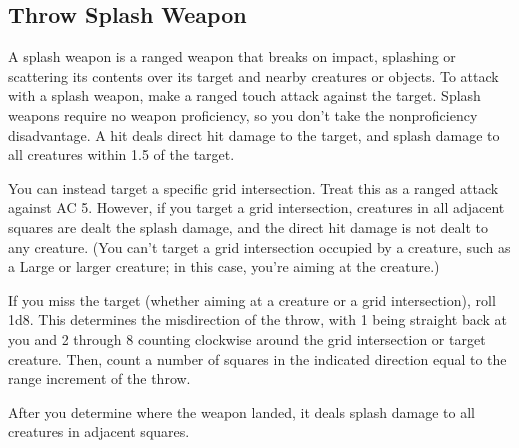 \subsection{Throw Splash Weapon}
A splash weapon is a ranged weapon that breaks on impact, splashing or scattering its contents over its target and nearby creatures or objects. To attack with a splash weapon, make a ranged touch attack against the target. Splash weapons require no weapon proficiency, so you don't take the nonproficiency disadvantage. A hit deals direct hit damage to the target, and splash damage to all creatures within 1.5 of the target.

You can instead target a specific grid intersection. Treat this as a ranged attack against AC 5. However, if you target a grid intersection, creatures in all adjacent squares are dealt the splash damage, and the direct hit damage is not dealt to any creature. (You can't target a grid intersection occupied by a creature, such as a Large or larger creature; in this case, you're aiming at the creature.)

If you miss the target (whether aiming at a creature or a grid intersection), roll 1d8. This determines the misdirection of the throw, with 1 being straight back at you and 2 through 8 counting clockwise around the grid intersection or target creature. Then, count a number of squares in the indicated direction equal to the range increment of the throw.

After you determine where the weapon landed, it deals splash damage to all creatures in adjacent squares.